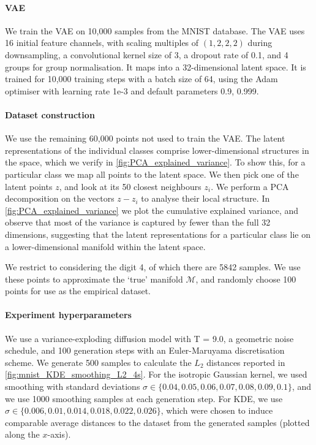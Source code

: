\documentclass[10pt]{article}
\theoremstyle{plain}
\theoremstyle{definition}
\theoremstyle{remark}
\begin{document}
\paragraph{VAE}
We train the VAE on 10,000 samples from the MNIST database.
The VAE uses 16 initial feature channels, with scaling multiples of $(1,2,2,2)$ during downsampling, a convolutional kernel size of 3, a dropout rate of 0.1, and 4 groups for group normalisation. It maps into a 32-dimensional latent space. It is trained for 10,000 training steps with a batch size of 64, using the Adam optimiser \citep{kingma15_adam} with learning rate 1e-3 and default parameters 0.9, 0.999.

\paragraph{Dataset construction} We use the remaining 60,000 points not used to train the VAE. The latent representations of the individual classes comprise lower-dimensional structures in the space, which we verify in \cref{fig:PCA_explained_variance}. To show this, for a particular class we map all points to the latent space. We then pick one of the latent points $z$, and look at its 50 closest neighbours $z_i$. We perform a PCA decomposition on the vectors $z - z_i$ to analyse their local structure. In \cref{fig:PCA_explained_variance} we plot the cumulative explained variance, and observe that most of the variance is captured by fewer than the full 32 dimensions, suggesting that the latent representations for a particular class lie on a lower-dimensional manifold within the latent space.

We restrict to considering the digit 4, of which there are 5842 samples. We use these points to approximate the `true' manifold $\mathcal{M}$, and randomly choose 100 points for use as the empirical dataset.

\paragraph{Experiment hyperparameters}
We use a variance-exploding diffusion model with T = 9.0, a geometric noise schedule, and 100 generation steps with an Euler-Maruyama discretisation scheme. We generate 500 samples to calculate the $L_2$ distances reported in \cref{fig:mnist_KDE_smoothing_L2_4s}. For the isotropic Gaussian kernel, we used smoothing with standard deviations $\sigma \in \{0.04, 0.05, 0.06, 0.07, 0.08, 0.09, 0.1\}$, and we use 1000 smoothing samples at each generation step. For KDE, we use $\sigma \in \{0.006, 0.01, 0.014, 0.018, 0.022, 0.026\}$, which were chosen to induce comparable average distances to the dataset from the generated samples (plotted along the $x$-axis).
\end{document}
